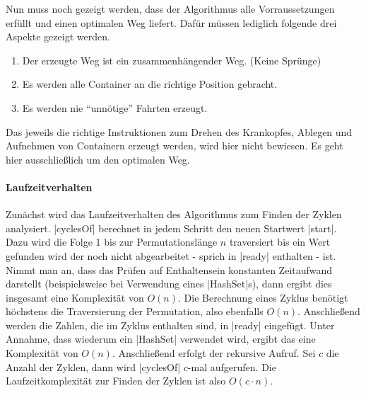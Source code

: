 Nun muss noch gezeigt werden, dass der Algorithmus alle Vorraussetzungen erfüllt und einen optimalen Weg liefert.
Dafür müssen lediglich folgende drei Aspekte gezeigt werden.
\begin{enumerate}
 \item Der erzeugte Weg ist ein zusammenhängender Weg. (Keine Sprünge)
 \item Es werden alle Container an die richtige Position gebracht.
 \item Es werden nie ``unnötige'' Fahrten erzeugt.
\end{enumerate}
Das jeweils die richtige Instruktionen zum Drehen des Krankopfes, Ablegen und Aufnehmen von Containern erzeugt werden, wird hier nicht bewiesen.
Es geht hier ausschließlich um den optimalen Weg.


\paragraph{Laufzeitverhalten}
Zunächst wird das Laufzeitverhalten des Algorithmus zum Finden der Zyklen analysiert.
|cyclesOf| berechnet in jedem Schritt den neuen Startwert |start|.
Dazu wird die Folge 1 bis zur Permutationslänge $n$ traversiert bis ein Wert gefunden wird der noch nicht abgearbeitet - sprich in |ready| enthalten - ist.
Nimmt man an, dass das Prüfen auf Enthaltensein konstanten Zeitaufwand darstellt (beispielsweise bei Verwendung eines |HashSet|s), dann ergibt dies insgesamt eine Komplexität von $O(n)$.
Die Berechnung eines Zyklus benötigt höchstens die Traversierung der Permutation, also ebenfalls $O(n)$. %
Anschließend werden die Zahlen, die im Zyklus enthalten sind, in |ready| eingefügt. Unter Annahme, dass wiederum ein |HashSet| verwendet wird, ergibt das eine Komplexität von $O(n)$.
Anschließend erfolgt der rekursive Aufruf. Sei $c$ die Anzahl der Zyklen, dann wird |cyclesOf| $c$-mal aufgerufen.
Die Laufzeitkomplexität zur Finden der Zyklen ist also $O(c \cdot n)$.

